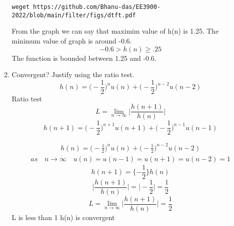 \documentclass[journal,12pt,twocolumn]{IEEEtran}
\renewcommand\thesection{\arabic{section}}
\begin{document}
\begin{enumerate}[label=\thesection.\arabic*]
\begin{lstlisting}
\end{lstlisting}
\begin{lstlisting}
weget https://github.com/Bhanu-das/EE3900-2022/blob/main/filter/figs/dtft.pdf
\end{lstlisting}
From the graph we can say that maximim value of h(n) is 1.25. 
The minimum value of graph is around -0.6.
$$-0.6 >h(n)\geq.25$$
The function is bounded between 1.25 and -0.6.
%
\item Convergent? Justify using the ratio test.
\\
\solution
\begin{equation}
{h(n)=\bigg(-\frac{1}{2}\bigg)^nu(n)+\bigg(-\frac{1}{2}\bigg)^{n-2}u(n-2)}
\end{equation}
 Ratio test
\begin{equation}
L=\lim_{n\to\infty} \bigg|\frac{h(n+1)}{h(n)}\bigg|
\end{equation}
\begin{equation}
h(n+1)=\bigg(-\frac{1}{2}\bigg)^{n+1}u(n+1)+\bigg(-\frac{1}{2}\bigg)^{n-1}u(n-1)
\end{equation}

\begin{align}
h(n)=\bigg(-\frac{1}{2}\bigg)^nu(n)+\bigg(-\frac{1}{2}\bigg)^{n-2}u(n-2)
\end{align}
\begin{align}
as \quad n \rightarrow \infty \quad u(n)=u(n-1)=u(n+1)=u(n-2)=1
\end{align}
\begin{equation}
h(n+1)={\{-\frac{1}{2}}\}{h(n)}
\end{equation}
\begin{equation}
\bigg|\frac{h(n+1)}{h(n)}\bigg|=\bigg|-\frac{1}{2}\bigg|=\frac{1}{2}
\end{equation}
\begin{equation}
L=\lim_{n\to\infty} \bigg|\frac{h(n+1)}{h(n)}\bigg|=\frac{1}{2}
\end{equation}
L is less than 1 h(n) is convergent


\end{enumerate}
\end{document}
